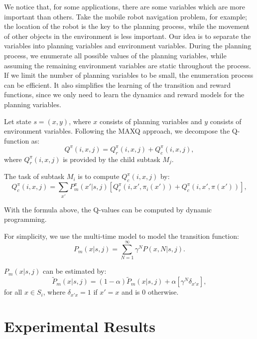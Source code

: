 We notice that, for some applications, there are some variables which are more important
than others. Take the mobile robot navigation problem, for example; the location of the robot 
is the key to the planning process, while the movement of other objects in the environment is less important.
Our idea is to separate the variables into planning variables 
and environment variables. During the planning process, we enumerate all possible values of the planning variables, while assuming 
the remaining environment variables are static throughout the process. 
If we limit the number of planning variables to be small, the enumeration process can be efficient.
It also simplifies the learning of the transition and reward functions, since we only need to learn
the dynamics and reward models for the planning variables.

Let state $s = (x, y)$, where $x$ consists of planning variables and $y$ consists of environment
variables. Following the MAXQ approach, we decompose the Q-function as:
\begin{equation}
    Q^{\pi}(i, x, j) = Q_r^{\pi}(i, x, j) + Q_c^{\pi}(i, x, j),
    \label{eq:biasedMaxQ}
\end{equation}
where $Q_r^{\pi}(i, x, j)$ is provided by the child subtask $M_j$.

The task of subtask $M_i$ is to compute $Q_c^{\pi}(i, x, j)$ by:
\begin{equation}
    Q_c^{\pi}(i, x, j) = \sum_{x'} P_m^{\pi}(x'|s, j)[Q_r^{\pi}(i, x', \pi_i(x')) + Q_c^{\pi}(i, x', \pi(x'))],
    \label{eq:biasedQc}
\end{equation}

With the formula above, the Q-values can be computed by dynamic programming.

For simplicity, we use the multi-time model \cite{SMDP} to model the transition function: 
\begin{equation}
    P_m(x|s, j) = \sum^{\infty}_{N=1} \gamma^N P(x, N|s, j).
    \label{eq:multiProb}
\end{equation}

$P_m(x|s, j)$ can be estimated by:
\begin{equation}
    \tilde{P}_m(x|s, j) = (1-\alpha)\tilde{P}_m(x|s, j) + \alpha [ \gamma^N \delta_{x'x}],
    \label{eq:approxP}
\end{equation}
for all $x \in S_i$, where $\delta_{x'x}=1$ if $x' = x$ and is 0 otherwise.

\section{Experimental Results}

